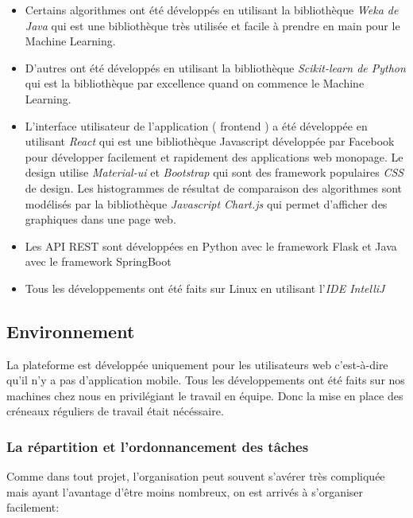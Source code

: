 \documentclass[a4paper,11pt]{article}
\begin{document}
\begin{itemize}
    \item Certains algorithmes ont été développés en utilisant la bibliothèque \emph{Weka de Java}
    qui est une bibliothèque très utilisée et facile à prendre en main pour le Machine Learning.

    \item D'autres ont été développés en utilisant la bibliothèque \emph{Scikit-learn de Python}
    qui est la bibliothèque par excellence quand on commence le Machine Learning.

    \item L'interface utilisateur de l’application ( frontend ) a été développée en utilisant \emph{React} qui est une bibliothèque Javascript développée par Facebook pour développer facilement et rapidement des applications web monopage.
    Le design utilise \emph{Material-ui} et \emph{Bootstrap} qui sont des framework populaires \emph{CSS} de design.
    Les histogrammes de résultat de comparaison des algorithmes sont modélisés par la bibliothèque \emph{Javascript Chart.js} qui permet d’afficher des graphiques dans une page web.

    \item Les API REST sont développées en Python avec le framework Flask et Java avec le framework SpringBoot

    \item Tous les développements ont été faits sur Linux en utilisant l’\emph{IDE IntelliJ}

\end{itemize}

    \subsection{Environnement}
La plateforme est développée uniquement pour les utilisateurs web c’est-à-dire qu’il n’y a pas d’application mobile.
Tous les développements ont été faits sur nos machines chez nous en privilégiant le travail en équipe. Donc la mise en place des créneaux réguliers de travail était nécéssaire.
\subsubsection{La répartition et l'ordonnancement des tâches}

Comme dans tout projet, l'organisation peut souvent s'avérer très compliquée
mais ayant l'avantage d'être moins nombreux, on est arrivés à s'organiser facilement:
\end{document}
